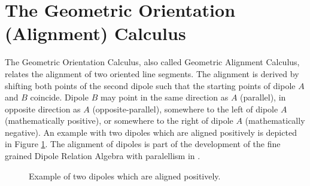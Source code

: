 
\section{The Geometric Orientation (Alignment) Calculus}\label{sec:geomoricalc}


The Geometric Orientation Calculus, also called Geometric Alignment Calculus,
relates the alignment of two oriented line segments.
The alignment is derived by shifting both points of the second dipole
such that the starting points of dipole $A$ and $B$ coincide.
Dipole $B$ may point
in the same direction as $A$ (parallel),
in opposite direction as $A$ (opposite-parallel),
somewhere to the left of dipole $A$ (mathematically positive),
or somewhere to the right of dipole $A$ (mathematically negative).
An example with two dipoles which are aligned positively
is depicted in Figure \ref{fig:AlignCalc_Positive}.
The alignment of dipoles is part of the development of
the fine grained Dipole Relation Algebra with paralellism
in \citep{cosy:dylla:2004:qsnhinsitcalc_b}.


\begin{figure}[htb]
\begin{center}
\addtolength{\abovecaptionskip}{-15pt}
\scalebox{0.8}{}
\caption{Example of two dipoles which are aligned positively.}
\label{fig:AlignCalc_Positive}
\end{center}
\end{figure}

